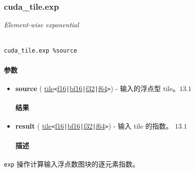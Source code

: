\documentclass{article}
\begin{document}
\subsubsection{cuda\_tile.exp}


\textit{Element-wise exponential}




\begin{lstlisting}

cuda_tile.exp %source

\end{lstlisting}



\paragraph{参数}


\begin{itemize}
\item \textbf{source} ( \href{https://docs.nvidia.com/cuda/tile-ir/latest/sections/types.html#type-tile}{tile}\texttt{<}\href{https://docs.nvidia.com/cuda/tile-ir/latest/sections/types.html#subsection-element-types}{f16}\texttt{|}\href{https://docs.nvidia.com/cuda/tile-ir/latest/sections/types.html#subsection-element-types}{bf16}\texttt{|}\href{https://docs.nvidia.com/cuda/tile-ir/latest/sections/types.html#subsection-element-types}{f32}\texttt{|}\href{https://docs.nvidia.com/cuda/tile-ir/latest/sections/types.html#subsection-element-types}{f64}\texttt{>}) - 输入的浮点型 tile。$\boxed{13.1}$




\paragraph{结果}


\item \textbf{result} ( \href{https://docs.nvidia.com/cuda/tile-ir/latest/sections/types.html#type-tile}{tile}\texttt{<}\href{https://docs.nvidia.com/cuda/tile-ir/latest/sections/types.html#subsection-element-types}{f16}\texttt{|}\href{https://docs.nvidia.com/cuda/tile-ir/latest/sections/types.html#subsection-element-types}{bf16}\texttt{|}\href{https://docs.nvidia.com/cuda/tile-ir/latest/sections/types.html#subsection-element-types}{f32}\texttt{|}\href{https://docs.nvidia.com/cuda/tile-ir/latest/sections/types.html#subsection-element-types}{f64}\texttt{>}) - 输入 tile 的指数。 $\boxed{13.1}$




\paragraph{描述}


\end{itemize}
\texttt{exp} 操作计算输入浮点数图块的逐元素指数。
\end{document}
